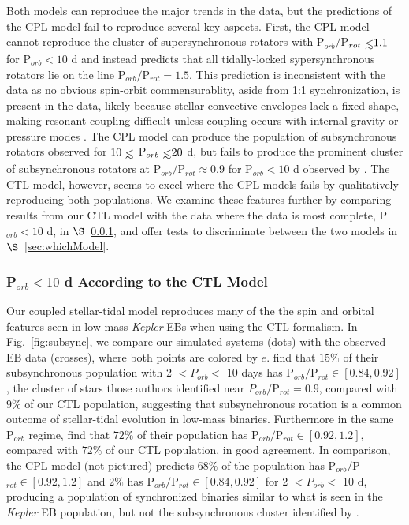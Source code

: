 \documentclass[twocolumn]{aastex61}
\def\lsim{~\rlap{$<$}{\lower 1.0ex\hbox{$\sim$}}}
\newcommand{\kepler}[0]{\textit{Kepler}\xspace}
\begin{document}
Both models can reproduce the major trends in the data, but the predictions of the CPL model fail to reproduce several key aspects.  First, the CPL model cannot reproduce the cluster of supersynchronous rotators with P$_{orb}/$P$_{rot} \lsim 1.1$ for P$_{orb} < 10$ d and instead predicts that all tidally-locked sypersynchronous rotators lie on the line P$_{orb}/$P$_{rot} = 1.5$.  This prediction is inconsistent with the data as no obvious spin-orbit commensurablity, aside from 1:1 synchronization, is present in the data, likely because stellar convective envelopes lack a fixed shape, making resonant coupling difficult unless coupling occurs with internal gravity or pressure modes \citep{Burkart2014,Lurie2017}.  The CPL model can produce the population of subsynchronous rotators observed for $10 \lsim$ P$_{orb} \lsim 20$ d, but fails to produce the prominent cluster of subsynchronous rotators at P$_{orb}/$P$_{rot} \approx 0.9$ for P$_{orb} < 10$ d observed by \citet{Lurie2017}.  The CTL model, however, seems to excel where the CPL models fails by qualitatively reproducing both populations. We examine these features further by comparing results from our CTL model with the \citet{Lurie2017} data where the data is most complete, P$_{orb} < 10$ d, in $\S$~\ref{sec:subsync}, and offer tests to discriminate between the two models in $\S$~\ref{sec:whichModel}. 

\subsubsection{P$_{orb} < 10$ d According to the CTL Model} \label{sec:subsync}

Our coupled stellar-tidal model reproduces many of the the spin and orbital features seen in low-mass \kepler EBs when using the CTL formalism. In Fig.~\ref{fig:subsync}, we compare our simulated systems (dots) with the observed \citet{Lurie2017} EB data (crosses), where both points are colored by $e$. \citet{Lurie2017} find that $15\%$ of their subsynchronous population with 2 $< P_{orb} <$ 10 days has P$_{orb}/$P$_{rot} \in [0.84, 0.92]$, the cluster of stars those authors identified near $P_{orb}/$P$_{rot} = 0.9$, compared with $9\%$ of our CTL population, suggesting that subsynchronous rotation is a common outcome of stellar-tidal evolution in low-mass binaries. Furthermore in the same P$_{orb}$ regime, \citet{Lurie2017} find that $72\%$ of their population has P$_{orb}/$P$_{rot} \in [0.92, 1.2]$, compared with $72\%$ of our CTL population, in good agreement. In comparison, the CPL model (not pictured) predicts $68\%$ of the population has P$_{orb}/$P$_{rot} \in [0.92, 1.2]$ and $2\%$ has P$_{orb}/$P$_{rot} \in [0.84, 0.92]$ for 2 $< P_{orb} < $ 10 d, producing a population of synchronized binaries similar to what is seen in the \kepler EB population, but not the subsynchronous cluster identified by \citet{Lurie2017}.   
\end{document}
